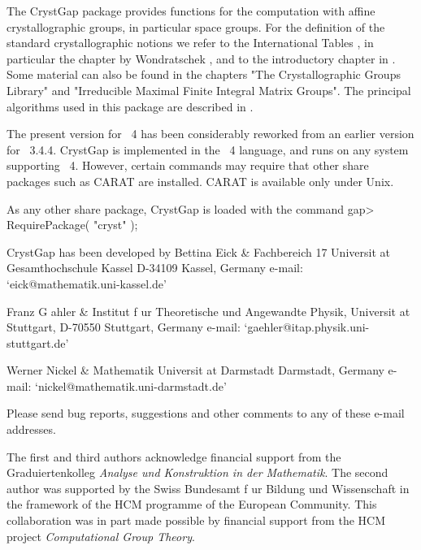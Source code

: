 
The CrystGap package provides functions for the computation with
affine crystallographic groups, in particular space groups.  For the
definition of the standard crystallographic notions we refer to the
International Tables \cite{Hah95}, in particular the chapter by 
Wondratschek \cite{Won95}, and to the introductory chapter in 
\cite{BBNWZ78}. Some  material  can also be  found in  the chapters 
"The Crystallographic Groups Library" and "Irreducible Maximal Finite
Integral Matrix Groups". The principal algorithms used in this
package are described in \cite{EGN97}.

The present version for {\GAP}~4 has been considerably reworked from
an earlier version for {\GAP}~3.4.4. CrystGap is implemented in the 
{\GAP}~4 language,  and  runs on any system supporting {\GAP}~4.
However, certain commands may require that other share packages
such as CARAT are installed. CARAT is available only under Unix.

As any other share package, CrystGap is loaded with the command
\beginexample 
     gap> RequirePackage( "cryst" ); 
\endexample

CrystGap has been developed by
\beginitems
Bettina Eick &
Fachbereich 17
Universit{ a}t Gesamthochschule Kassel
D-34109 Kassel, Germany \hfill\break 
e-mail: `eick@mathematik.uni-kassel.de'

Franz G{ a}hler &
Institut f{ u}r Theoretische und Angewandte Physik,\hfil\break
Universit{ a}t Stuttgart,
D-70550 Stuttgart, Germany \hfill\break
e-mail: `gaehler@itap.physik.uni-stuttgart.de'

Werner Nickel &
Mathematik
Universit{ a}t Darmstadt \hfill\break
Darmstadt, Germany \hfill\break
e-mail: `nickel@mathematik.uni-darmstadt.de'
\enditems

Please send bug reports,  suggestions and other  comments to any of these
e-mail addresses.

The   first and  third  authors acknowledge  financial  support from  the
Graduiertenkolleg {\it Ana\-lyse und Konstruktion in der Mathematik}. The
second author   was supported  by the  Swiss  Bundesamt  f{ u}r
Bildung und Wissenschaft  in the framework  of the  HCM programme of  the
European   Community.  This collaboration was in   part  made possible by
financial support from the HCM project {\it Computational Group Theory}.




